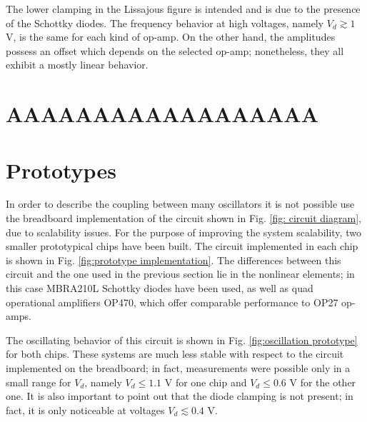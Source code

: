 The lower clamping in the Lissajous
figure is intended and is due to the presence of the Schottky diodes.
The frequency behavior at high voltages,
namely $V_d \gtrsim 1$ V, is the same for each kind of op-amp.
On the other hand, the amplitudes possess an offset which depends on
the selected op-amp; nonetheless, they all exhibit a mostly linear
behavior.















\section{AAAAAAAAAAAAAAAAAA}\label{sec:breadboard}

\section{Prototypes}\label{sec:prototypes}

In order to describe the coupling between many oscillators it is
not possible use the breadboard implementation of the circuit
shown in Fig. \ref{fig: circuit diagram}, due to
scalability issues. For the purpose of improving the system
scalability, two smaller prototypical chips have been built.
The circuit implemented in each chip is shown in Fig.
\ref{fig:prototype implementation}. The differences between this
circuit and the one used in the previous section lie in the nonlinear
elements; in this case MBRA210L Schottky diodes have been used,
as well as quad operational amplifiers OP470, which offer
comparable performance to OP27 op-amps.

The oscillating behavior of this circuit is shown in Fig.
\ref{fig:oscillation prototype} for both chips. These systems are much
less stable with respect to the circuit implemented on the breadboard;
in fact, measurements were possible only in a small range for $V_d$,
namely $V_d \leq 1.1$ V for one chip and $V_d \leq 0.6$ V for the
other one. It is also important to point out that the diode clamping
is not present; in fact, it is only noticeable at voltages
$V_d \lesssim 0.4$ V.


